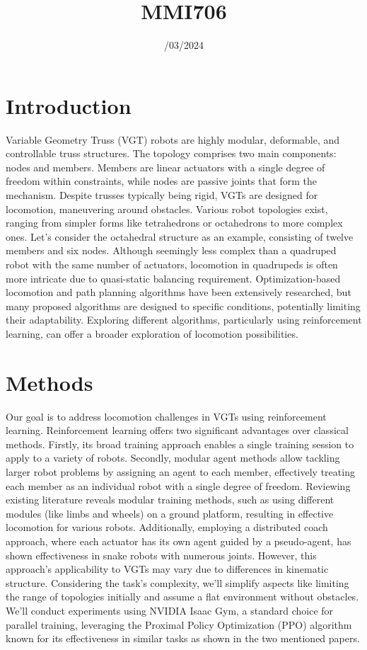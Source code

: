 \documentclass[9pt]{osa-supplemental-document}
\title{\textbf{MMI706}  \hfill \text{\fontseries{m} \fontsize{18}{20} \selectfont METU} \\ \text{\fontseries{m}\selectfont Reinforcement Learning} \hfill \text{\fontseries{m} \fontsize{18}{20} \selectfont Phase-I}}
\author{\fontsize{12}{14}\fontseries{m}\selectfont18/03/2024}
\begin{document}
\sffamily\large\selectfont

\maketitle

\section{Introduction}

Variable Geometry Truss (VGT) robots  are highly modular, deformable, and controllable truss structures. The topology comprises two main components: nodes and members. Members are linear actuators with a single degree of freedom within constraints, while nodes are passive joints that form the mechanism. Despite trusses typically being rigid, VGTs are designed for locomotion, maneuvering around obstacles. Various robot topologies exist, ranging from simpler forms like tetrahedrons or octahedrons to more complex ones. Let's consider the octahedral structure as an example, consisting of twelve members and six nodes. Although seemingly less complex than a quadruped robot with the same number of actuators, locomotion in quadrupeds is often more intricate due to quasi-static balancing requirement. Optimization-based locomotion and path planning algorithms have been extensively researched, but many proposed algorithms are designed to specific conditions, potentially limiting their adaptability. Exploring different algorithms, particularly using reinforcement learning, can offer a broader exploration of locomotion possibilities.

\section{Methods}
Our goal is to address locomotion challenges in VGTs using reinforcement learning. Reinforcement learning offers two significant advantages over classical methods. Firstly, its broad training approach enables a single training session to apply to a variety of robots. Secondly, modular agent methods allow tackling larger robot problems by assigning an agent to each member, effectively treating each member as an individual robot with a single degree of freedom. Reviewing existing literature reveals modular training methods, such as using different modules (like limbs and wheels) on a ground platform, resulting in effective locomotion for various robots. Additionally, employing a distributed coach approach, where each actuator has its own agent guided by a pseudo-agent, has shown effectiveness in snake robots with numerous joints. However, this approach's applicability to VGTs may vary due to differences in kinematic structure. Considering the task's complexity, we'll simplify aspects like limiting the range of topologies initially and assume a flat environment without obstacles. We'll conduct experiments using NVIDIA Isaac Gym, a standard choice for parallel training, leveraging the Proximal Policy Optimization (PPO) algorithm known for its effectiveness in similar tasks as shown in the two mentioned papers.
\end{document}
